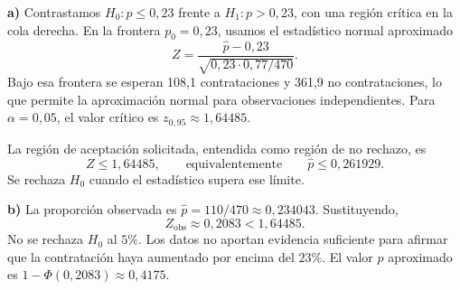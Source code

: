 \textbf{a)} Contrastamos $H_0:p\le0{,}23$ frente a $H_1:p>0{,}23$, con una región crítica en la cola derecha. En la frontera $p_0=0{,}23$, usamos el estadístico normal aproximado
\[
 Z=\frac{\hat p-0{,}23}{\sqrt{0{,}23\cdot0{,}77/470}}.
\]
Bajo esa frontera se esperan 108,1 contrataciones y 361,9 no contrataciones, lo que permite la aproximación normal para observaciones independientes. Para $\alpha=0{,}05$, el valor crítico es $z_{0{,}95}\approx1{,}64485$.

La región de aceptación solicitada, entendida como región de no rechazo, es
\[
 \boxed{Z\le1{,}64485},
 \qquad\text{equivalentemente}\qquad\hat p\le0{,}261929.
\]
Se rechaza $H_0$ cuando el estadístico supera ese límite.

\textbf{b)} La proporción observada es $\hat p=110/470\approx0{,}234043$. Sustituyendo,
\[
 Z_{\mathrm{obs}}\approx0{,}2083<1{,}64485.
\]
No se rechaza $H_0$ al $5\%$. Los datos no aportan evidencia suficiente para afirmar que la contratación haya aumentado por encima del $23\%$. El valor $p$ aproximado es $1-\Phi(0{,}2083)\approx0{,}4175$.
